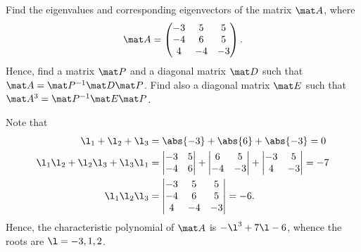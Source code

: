 \begin{problem}
    Find the eigenvalues and corresponding eigenvectors of the matrix $\mat A$, where \[\mat A = \begin{pmatrix}-3 & 5 & 5 \\ -4 & 6 & 5 \\ 4 & -4 & -3\end{pmatrix}.\] Hence, find a matrix $\mat P$ and a diagonal matrix $\mat D$ such that $\mat A = \mat P^{-1} \mat D \mat P$. Find also a diagonal matrix $\mat E$ such that $\mat A^3 = \mat P^{-1} \mat E \mat P$.
\end{problem}
\begin{solution}
    Note that
    \begin{align*}
        \l_1 + \l_2 + \l_3 &= \abs{-3} + \abs{6} + \abs{-3} = 0\\
        \l_1 \l_2 + \l_2 \l_3 + \l_3 \l_1 &= \begin{vmatrix}-3 & 5 \\ -4 & 6\end{vmatrix} + \begin{vmatrix}6 & 5 \\ -4 & -3\end{vmatrix} + \begin{vmatrix}-3 & 5 \\ 4 & -3\end{vmatrix} = -7 \\
        \l_1 \l_2 \l_3 &= \begin{vmatrix}-3 & 5 & 5 \\ -4 & 6 & 5 \\ 4 & -4 & -3\end{vmatrix} = -6.
    \end{align*}
    Hence, the characteristic polynomial of $\mat A$ is $-\l^3 + 7\l -6$, whence the roots are $\l = -3, 1, 2$.
    

\end{solution}
